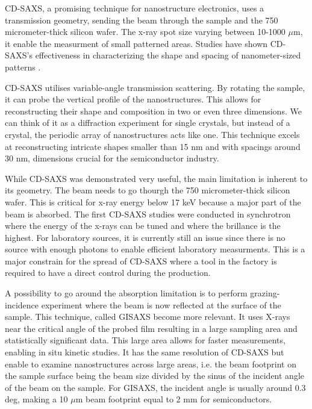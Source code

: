 \medskip

CD-SAXS, a promising technique for nanostructure electronics, uses a transmission geometry, sending the beam through the sample and the 750 micrometer-thick silicon wafer. The x-ray spot size varying between 10-1000 $\mu$m, it enable the measurment of small patterned areas. 
Studies have shown CD-SAXS's effectiveness in characterizing the shape and spacing of nanometer-sized patterns \cite{sunday_2015}.

\medskip
CD-SAXS  utilises variable-angle transmission scattering. By rotating the sample, it can probe the vertical profile of the nanostructures. This allows 
for reconstructing their shape and composition in two or even three dimensions.
We can think of it as a diffraction experiment for single crystals, but instead of a crystal, the 
periodic array of nanostructures acts like one. This technique excels at reconstructing 
intricate shapes smaller than 15 nm and with spacings around 30 nm, dimensions crucial for 
the semiconductor industry. \cite{first_cdsaxs_article}

\medskip
While CD-SAXS was demonstrated very useful, the main limitation is inherent to its geometry. The beam needs to go thourgh the 750 micrometer-thick silicon wafer.
This is critical for x-ray energy below 17 keV because a major part of the beam is absorbed. The first CD-SAXS studies were conducted in synchrotron where the energy
of the x-rays can be tuned and where the brillance is the highest. For laboratory sources, it is currently still an issue since there is no source with enough photons to enable
efficient laboratory measurments. This is a major constrain for the spread of CD-SAXS where a tool in the factory is required to have a direct control during the production. 

\medskip
A possibility to go around the absorption limitation is to perform grazing-incidence experiment where the beam is now reflected at the surface of the sample. This technique, 
called GISAXS become more relevant. It uses X-rays near the critical angle of the probed film resulting in a large sampling area and statistically significant data. This large area allows for faster measurements, enabling in situ kinetic studies.
It has the same resolution of CD-SAXS but enable to examine nanostructures across large areas, i.e. the beam footprint on the sample surface 
being the beam size divided by the sinus of the incident angle of the beam on the sample. For GISAXS, the incident angle is usually around 0.3 deg, making a 10 $\mu$m beam footprint equal to 2 mm   
for semiconductors. 

